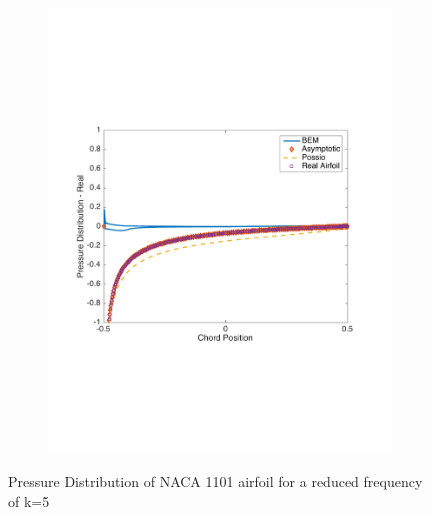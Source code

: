 \documentclass{article}
\begin{document}
\begin{figure}[h]
\begin{subfigure}{0.33\textwidth}
	\includegraphics[width = \textwidth, height=0.16\textheight]{NACA1101_pressure_k5real}
\end{subfigure}%
\caption{Pressure Distribution of NACA 1101 airfoil for a reduced frequency of k=5}
\end{figure}
\end{document}

